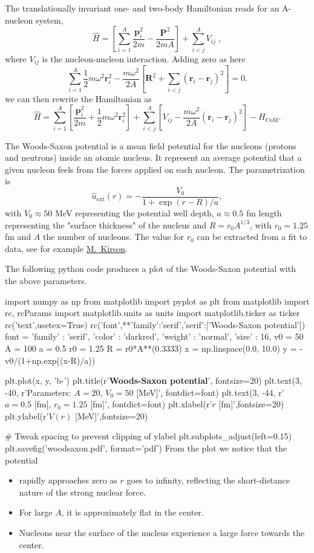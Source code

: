 \documentclass[%
twoside,                 %
final,                   %
10pt]{article}
\begin{document}
 The translationally invariant one- and two-body  Hamiltonian reads for an A-nucleon system,
 \[
\label{eq:ham}
\hat{H}=\left[\sum_{i=1}^A\frac{\bm{p}_i^2}{2m} -\frac{\bm{P}^2}{2mA}\right] +\sum_{i < j}^A V_{ij} \; ,
 \]
 where $V_{ij}$ is the nucleon-nucleon interaction. Adding zero as here
\[
 \sum_{i=1}^A\frac{1}{2}m\omega^2\bm{r}_i^2-
 \frac{m\omega^2}{2A}\left[\bm{R}^2+\sum_{i < j}(\bm{r}_i-\bm{r}_j)^2\right]=0.
 \]
we can then rewrite the Hamiltonian as 
\[
 \hat{H}=\sum_{i=1}^A \left[ \frac{\bm{p}_i^2}{2m}
 +\frac{1}{2}m\omega^2 \bm{r}^2_i
 \right] + \sum_{i < j}^A \left[ V_{ij}-\frac{m\omega^2}{2A}
 (\bm{r}_i-\bm{r}_j)^2
 \right]-H_{\mathrm{CoM}}.
 \]


The Woods-Saxon potential is a mean field potential for the nucleons (protons and neutrons) 
inside an atomic nucleus. It represent an average potential that a given nucleon feels from  the forces applied on each nucleon. 
The parametrization is
\[
\hat{u}_{\mathrm{ext}}(r)=-\frac{V_0}{1+\exp{(r-R)/a}},
\]
with $V_0\approx 50$ MeV representing the potential well depth, $a\approx 0.5$ fm 
length representing the "surface thickness" of the nucleus and $R=r_0A^{1/3}$, with $r_0=1.25$ fm and $A$ the number of nucleons.
The value for $r_0$ can be extracted from a fit to data, see for example \href{{http://www.sciencedirect.com/science/article/pii/S037594740600769X}}{M.~Kirson}.

The following python code produces a plot of the Woods-Saxon potential with the above parameters. 

\bpypro
import numpy as np
from  matplotlib import pyplot as plt
from matplotlib import rc, rcParams
import matplotlib.units as units
import matplotlib.ticker as ticker
rc('text',usetex=True)
rc('font',**{'family':'serif','serif':['Woods-Saxon potential']})
font = {'family' : 'serif',
        'color'  : 'darkred',
        'weight' : 'normal',
        'size'   : 16,
        }
v0 = 50
A = 100
a = 0.5
r0 = 1.25
R = r0*A**(0.3333)
x = np.linspace(0.0, 10.0)
y = -v0/(1+np.exp((x-R)/a))

plt.plot(x, y, 'b-')
plt.title(r'{\bf Woods-Saxon potential}', fontsize=20)     
plt.text(3, -40, r'Parameters: $A=20$, $V_0=50$ [MeV]', fontdict=font)
plt.text(3, -44, r'$a=0.5$ [fm], $r_0=1.25$ [fm]', fontdict=font)
plt.xlabel(r'$r$ [fm]',fontsize=20)
plt.ylabel(r'$V(r)$ [MeV]',fontsize=20)

# Tweak spacing to prevent clipping of ylabel
plt.subplots_adjust(left=0.15)
plt.savefig('woodsaxon.pdf', format='pdf')
\epypro
From the plot we notice that the potential
\begin{itemize}
\item rapidly approaches zero as $r$ goes to infinity, reflecting the short-distance nature of the strong nuclear force.

\item For large $A$, it is approximately flat in the center.

\item Nucleons near the surface of the nucleus experience a large force towards the center.
\end{itemize}
\end{document}
